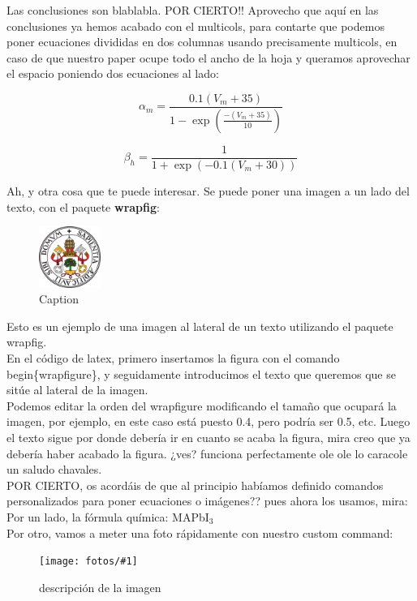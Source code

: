 \documentclass[12pt,a4paper]{article}
\newcommand{\MA}{MAPbI$_3$}
\newcommand{\NEWPIC}[3]{
\begin{figure}[H]
    \centering
    \texttt{[image: fotos/\#1]}
    \caption{#3}
    \label{#1}
    \end{figure}
    }
\begin{document}
Las conclusiones son blablabla. POR CIERTO!! Aprovecho que aquí en las conclusiones ya hemos acabado con el multicols, para contarte que podemos poner ecuaciones divididas en dos columnas usando precisamente multicols, en caso de que nuestro paper ocupe todo el ancho de la hoja y queramos aprovechar el espacio poniendo dos ecuaciones al lado:

\begin{multicols}{2}
\begin{equation}
    \alpha_{m}=\frac{0.1(V_{m}+35)}{1-\exp(\frac{-(V_{m}+35)}{10})}
    \label{ec:alpha_m}
\end{equation}

\begin{equation}
    \beta_{h}=\frac{1}{1+\exp(-0.1(V_{m}+30))}
    \label{ec:beta_h}
\end{equation}
\end{multicols}

Ah, y otra cosa que te puede interesar. Se puede poner una imagen a un lado del texto, con el paquete \textbf{wrapfig}:

\begin{figure}
\centering
\includegraphics[width=2cm]{fotos/escudo.png}
\caption{Caption}
\end{figure}

Esto es un ejemplo de una imagen al lateral de un texto utilizando el paquete wrapfig.\\
En el código de latex, primero insertamos la figura con el comando begin\{wrapfigure\}, y seguidamente introducimos el texto que queremos que se sitúe al lateral de la imagen.\\
Podemos editar la orden del wrapfigure modificando el tamaño que ocupará la imagen, por ejemplo, en este caso está puesto 0.4, pero podría ser 0.5, etc. Luego el texto sigue por donde debería ir en cuanto se acaba la figura, mira creo que ya debería haber acabado la figura. ¿ves? funciona perfectamente ole ole lo caracole un saludo chavales.\\[0.5cm]
POR CIERTO, os acordáis de que al principio habíamos definido comandos personalizados para poner ecuaciones o imágenes?? pues ahora los usamos, mira:\\
Por un lado, la fórmula química: \MA \\
Por otro, vamos a meter una foto rápidamente con nuestro custom command:
\NEWPIC{escudo}{5cm}{descripción de la imagen}
\end{document}
